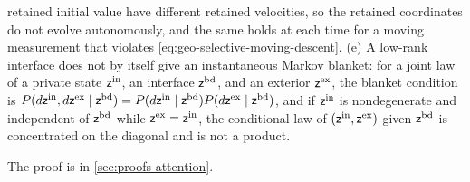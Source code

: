 retained initial value have different retained velocities, so the retained
coordinates do not evolve autonomously, and the same holds at each time for a
moving measurement that violates \eqref{eq:geo-selective-moving-descent}. (e) A
low-rank interface does not by itself give an instantaneous Markov blanket:
for a joint law of a private state \(\mathsf z^{\rm in}\), an interface
\(\mathsf z^{\rm bd}\), and an exterior \(\mathsf z^{\rm ex}\), the blanket
condition is
\(P(d\mathsf z^{\rm in},d\mathsf z^{\rm ex}\mid\mathsf z^{\rm bd})
=P(d\mathsf z^{\rm in}\mid\mathsf z^{\rm bd})P(d\mathsf z^{\rm ex}\mid\mathsf z^{\rm bd})\),
and if \(\mathsf z^{\rm in}\) is nondegenerate and independent of
\(\mathsf z^{\rm bd}\) while \(\mathsf z^{\rm ex}=\mathsf z^{\rm in}\), the
conditional law of \((\mathsf z^{\rm in},\mathsf z^{\rm ex})\) given
\(\mathsf z^{\rm bd}\) is concentrated on the diagonal and is not a product.

The proof is in \cref{sec:proofs-attention}.

